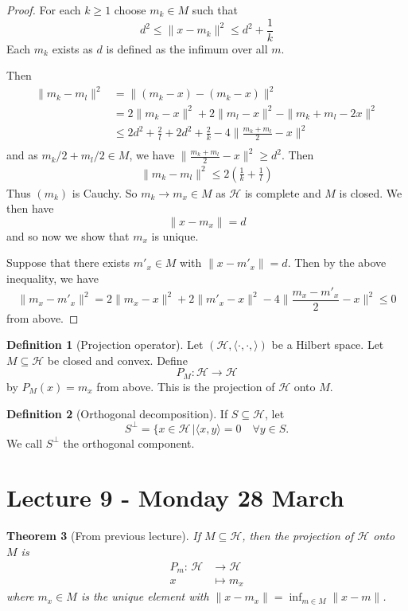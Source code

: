 \documentclass[10pt, reqno, oneside]{amsart}
\theoremstyle{plain}%
\newtheorem{thm}{Theorem}[section]
\theoremstyle{definition}
\newtheorem{defn}[thm]{Definition}
\theoremstyle{remark}
\renewcommand{\H}{\mathcal{H}}
\newcommand{\mapping}[5]{\begin{align*}
	#1 : \,     #2 &\rightarrow #3 \\
			#4  &\mapsto #5
\end{align*}	
}
\newcommand{\hilb}{(\H, \langle \cdot, \cdot, \rangle )}
\begin{document}
\begin{proof}
	For each $k \geq 1$ choose $m_k \in M$ such that \[
		d^2 \leq \| x - m_k \|^2 \leq d^2 + \frac{1}{k} 
	\] Each $m_k$ exists as $d$ is defined as the infimum over all $m$. 
	
	Then \begin{align*}
		\| m_k - m_l \|^2 	&= \| (m_k - x) - (m_k - x) \|^2 \\
							&= 2 \| m_k - x \|^2 + 2 \| m_l - x \|^2 - \| m_k + m_l - 2x \|^2 \\
							&\leq 2d^2 + \frac{2}{l} + 2d^2 + \frac{2}{k} - 4 \| \frac{ m_k + m_l}{2} - x \|^2 \\
	\end{align*} and as $m_k/2 + m_l/2 \in M$, we have $\| \frac{ m_k + m_l}{2} - x \|^2  \geq d^2$.  Then 
	\begin{align*}
			\| m_k - m_l \|^2 \leq 2 ( \frac{1}{k} + \frac{1}{l})
	\end{align*} Thus $(m_k)$ is Cauchy.  So $m_k \rightarrow m_x \in M$ as $\H$ is complete and $M$ is closed.  We then have \[
		\| x - m_x \| = d 
	\] and so now we show that $m_x$ is unique.  
	
	Suppose that there exists $m'_x \in M$ with $\| x - m'_x \| = d$.  Then by the above inequality, we have \[
		\| m_x - m'_x \|^2 = 2 \| m_x - x \|^2 + 2 \| m'_x - x \|^2 - 4 \| \frac{m_x - m'_x}{2} - x \|^2 \leq 0	
	\] from above. 
\end{proof}

\begin{defn}[Projection operator]
Let $\hilb$ be a Hilbert space.  Let $M \subseteq \H$ be closed and convex.  Define \[
	P_M : \H \rightarrow \H
\] by $P_M(x) = m_x$ from above. This is the projection of $\H$ onto $M$.
\end{defn}

\begin{defn}[Orthogonal decomposition]	
	If $S \subseteq \H$, let \[
		S^\perp = \{ x \in \H
 \, | \langle x, y \rangle = 0 \quad \forall y \in S. 
\] We call $S^\perp$ the orthogonal component.
\end{defn}


\section{Lecture 9 - Monday 28 March} %
\label{sec:lecture_9_monday_28_march}

\begin{thm}[From previous lecture]
	If $M \subseteq \H$, then the projection of $\H$ onto $M$ is \mapping{P_m}{\H}{\H}{x}{m_x} where $m_x \in M$ is the unique element with $\| x - m_x \| = \inf_{m \in M} \| x - m \|$.  
\end{thm}
\end{document}
